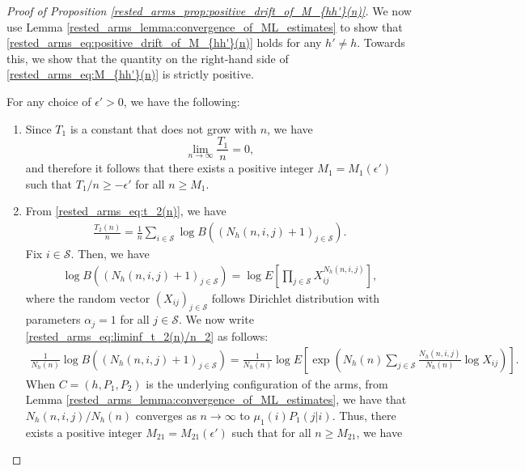 \begin{proof}[Proof of Proposition \ref{rested_arms_prop:positive_drift_of_M_{hh'}(n)}]
We now use Lemma \ref{rested_arms_lemma:convergence_of_ML_estimates} to show that \eqref{rested_arms_eq:positive_drift_of_M_{hh'}(n)} holds for any $h'\neq h$. Towards this, we show that the quantity on the right-hand side of \eqref{rested_arms_eq:M_{hh'}(n)} is strictly positive.

For any choice of $\epsilon'>0$, we have the following:
\begin{enumerate}
	\item Since $T_1$ is a constant that does not grow with $n$, we have
	\begin{equation}
		\lim\limits_{n\to\infty}\frac{T_1}{n}=0,\label{rested_arms_eq:liminf_t_1(n)/n_final}
	\end{equation}
	and therefore it follows that there exists a positive integer $M_1=M_1(\epsilon')$ such that $T_1/n\geq -\epsilon'$ for all $n\geq M_1$.
	\item From \eqref{rested_arms_eq:t_2(n)}, we have
    \begingroup\allowdisplaybreaks\begin{align}
    	\frac{T_2(n)}{n}=\frac{1}{n}\sum\limits_{i\in\mathcal{S}}\log B((N_h(n,i,j)+1)_{j\in\mathcal{S}}).\label{rested_arms_eq:liminf_t_2(n)/n_1}
    \end{align}\endgroup
    Fix $i\in\mathcal{S}$. Then, we have
    \begingroup\allowdisplaybreaks\begin{align}
    	\log B((N_h(n,i,j)+1)_{j\in\mathcal{S}})=\log E\left[\prod\limits_{j\in\mathcal{S}}X_{ij}^{N_h(n,i,j)}\right],\label{rested_arms_eq:liminf_t_2(n)/n_2}
    \end{align}\endgroup
    where the random vector $(X_{ij})_{j\in\mathcal{S}}$ follows Dirichlet distribution with parameters $\alpha_j=1$ for all $j\in\mathcal{S}$. We now write \eqref{rested_arms_eq:liminf_t_2(n)/n_2} as follows:
    \begingroup\allowdisplaybreaks\begin{align}
    	\frac{1}{N_h(n)}\log B((N_h(n,i,j)+1)_{j\in\mathcal{S}})
    	=\frac{1}{N_h(n)}\log E\left[\exp\left(N_h(n)\sum\limits_{j\in\mathcal{S}} \frac{N_h(n,i,j)}{N_h(n)}\log X_{ij}\right)\right].\label{rested_arms_eq:liminf_t_2(n)/n_3}
    \end{align}\endgroup
    When $C=(h,P_1,P_2)$ is the underlying configuration of the arms, from Lemma \ref{rested_arms_lemma:convergence_of_ML_estimates}, we have that $N_h(n,i,j)/N_h(n)$ converges  as $n\to\infty$ to $\mu_1(i)P_1(j|i)$. Thus, there exists a positive integer $M_{21}=M_{21}(\epsilon')$ such that for all $n\geq M_{21}$, we have

\end{enumerate}
\end{proof}
